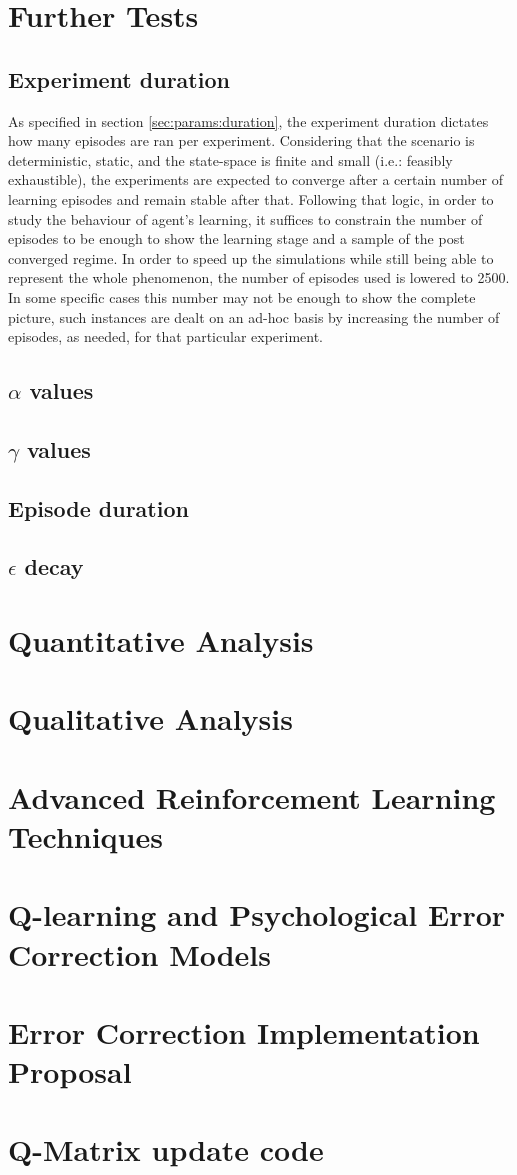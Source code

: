 \documentclass[11pt]{article}
\begin{document}
\section{Further Tests}
\subsection{Experiment duration}
As specified in section \ref{sec:params:duration}, the experiment duration dictates how many episodes are ran per experiment. Considering that the scenario is deterministic, static, and the state-space is finite and small (i.e.: feasibly exhaustible), the experiments are expected to converge after a certain number of learning episodes and remain stable after that. Following that logic, in order to study the behaviour of agent's learning, it suffices to constrain the number of episodes to be enough to show the learning stage and a sample of the post converged regime. In order to speed up the simulations while still being able to represent the whole phenomenon, the number of episodes used is lowered to 2500. In some specific cases this number may not be enough to show the complete picture, such instances are dealt on an ad-hoc basis by increasing the number of episodes, as needed, for that particular experiment.

\subsection{$\alpha$ values}


\subsection{$\gamma$ values}

\subsection{Episode duration}
\subsection{$\epsilon$ decay}


\section{Quantitative Analysis}
\section{Qualitative Analysis}
\section{Advanced Reinforcement Learning Techniques}
\section{Q-learning and Psychological Error Correction Models}
\section{Error Correction Implementation Proposal}



\appendix
\section{Q-Matrix update code}
\end{document}
